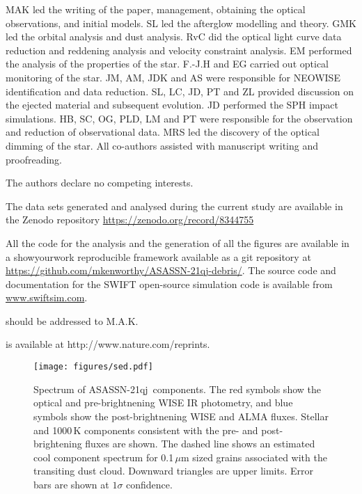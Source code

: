 \documentclass[sn-nature]{sn-jnl}%
\newcommand{\asas}{ASASSN-21qj}
\begin{document}
MAK led the writing of the paper, management, obtaining the optical observations, and initial models.
%
SL led the afterglow modelling and theory.
%
GMK led the orbital analysis and dust analysis.
%
RvC did the optical light curve data reduction and reddening analysis and velocity constraint analysis.
%
EM performed the analysis of the properties of the star.
%
F.-J.H and EG carried out optical monitoring of the star.
%
JM, AM, JDK and AS were responsible for NEOWISE identification and data reduction.
%
SL, LC, JD, PT and ZL provided discussion on the ejected material and subsequent evolution.
%
JD performed the SPH impact simulations.
%
HB, SC, OG, PLD, LM and PT were responsible for the observation and reduction of observational data.
%
MRS led the discovery of the optical dimming of the star.
%
All co-authors assisted with manuscript writing and proofreading.

 The authors declare no competing interests.

The data sets generated and analysed during the current study are available in the Zenodo repository \url{https://zenodo.org/record/8344755}

All the code for the analysis and the generation of all the figures  are available in a showyourwork \citep{Luger2021} reproducible framework available as a git repository at \url{https://github.com/mkenworthy/ASASSN-21qj-debris/}.
%
The source code and documentation for the SWIFT open-source simulation code is available from \url{www.swiftsim.com}.


should be addressed to M.A.K.

 is available at http://www.nature.com/reprints.
\newpage

\clearpage

\begin{figure}
    \centering
\texttt{[image: figures/sed.pdf]}
    \caption{Spectrum of \asas{}~components. The red symbols show the optical and pre-brightnening WISE IR photometry, and blue symbols show the post-brightnening WISE and ALMA fluxes. Stellar and 1000\,K components consistent with the pre- and post-brightening fluxes are shown. The dashed line shows an estimated cool component spectrum for 0.1\,$\mu$m sized grains associated with the transiting dust cloud. Downward triangles are upper limits.
    Error bars are shown at $1\sigma$ confidence.
}
    \label{fig:sed}
\end{figure}
%
\end{document}
